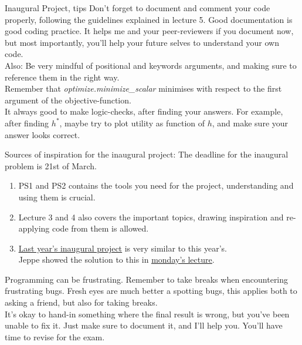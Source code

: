 \documentclass[10pt,danish,t,10pt]{beamer}
\newcommand{\code}[1]{\textit{#1}} %
\begin{document}
\begin{frame}{Inaugural Project, tips}
    Don't forget to document and comment your code properly, following  the guidelines explained in lecture 5. Good documentation is good coding practice. It helps me and your peer-reviewers if you document now, but most importantly, you'll help your future selves to understand your own code. \\
    Also: Be very mindful of positional and keywords arguments, and making sure to reference them in the right way. \\
    Remember that \code{optimize.minimize\_scalar} minimises with respect to the first argument of the objective-function. \\
    It always good to make logic-checks, after finding your answers. For example, after finding $h^{*}$, maybe try to plot utility as function of $h$, and make sure your answer looks correct. 
\end{frame}



\begin{frame}{Sources of inspiration for the inaugural project:}
    The deadline for the inaugural problem is 21st of March.
    \begin{enumerate}
        \item PS1 and PS2 contains the tools you need for the project, understanding and using them is crucial.
        \item Lecture 3 and 4 also covers the important topics, drawing inspiration and re-applying code from them is allowed. 
        \item \href{https://github.com/NumEconCopenhagen/lectures-2020/blob/master/projects/InauguralProject.pdf}{\underline{Last year's inaugural project}} is very similar to this year's. \\
        Jeppe showed the solution to this in \href{https://github.com/NumEconCopenhagen/lectures-2021/blob/master/06/Examples_and_overview.ipynb}{\underline{monday's lecture}}.
    \end{enumerate}
    Programming can be frustrating. Remember to take breaks when encountering frustrating bugs. Fresh eyes are much better a spotting bugs, this applies both to asking a friend, but also for taking breaks. \\
    It's okay to hand-in something where the final result is wrong, but you've been unable to fix it. Just make sure to document it, and I'll help you. You'll have time to revise for the exam.
    
\end{frame}
\end{document}
